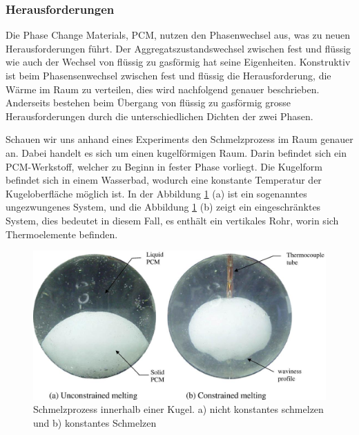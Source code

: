 \documentclass[11pt,a4paper]{scrartcl}
\begin{document}
\subsubsection{Herausforderungen}

Die Phase Change Materials, PCM, nutzen den Phasenwechsel aus, was zu neuen
Herausforderungen führt. Der Aggregatszustandswechsel zwischen fest und flüssig
wie auch der Wechsel von flüssig zu gasförmig hat seine Eigenheiten. Konstruktiv
ist beim Phasensenwechsel zwischen fest und flüssig die Herausforderung, die
Wärme im Raum zu verteilen, dies wird nachfolgend genauer beschrieben.
Anderseits bestehen beim Übergang von flüssig zu gasförmig grosse
Herausforderungen durch die unterschiedlichen Dichten der zwei Phasen.

Schauen wir uns anhand eines Experiments den Schmelzprozess im Raum genauer an.
Dabei handelt es sich um einen kugelförmigen Raum. Darin befindet sich ein
PCM-Werkstoff, welcher zu Beginn in fester Phase vorliegt. Die Kugelform
befindet sich in einem Wasserbad, wodurch eine konstante
Temperatur der Kugeloberfläche möglich ist. In der Abbildung
\ref{fig:meltingpaper} (a) ist ein sogenanntes ungezwungenes System, und die
Abbildung \ref{fig:meltingpaper} (b) zeigt ein eingeschränktes System, dies
bedeutet in diesem Fall, es enthält ein vertikales Rohr, worin sich
Thermoelemente befinden.

\begin{figure}[h!]
\begin{center}
\includegraphics[scale=0.4]{images/Meltinginsidesphere.jpg}
\caption{Schmelzprozess innerhalb einer Kugel. a) nicht konstantes schmelzen und
b) konstantes Schmelzen \cite{WasteEnergyHarvesting}}
\label{fig:meltingpaper}
\end{center}
\end{figure}
\end{document}
